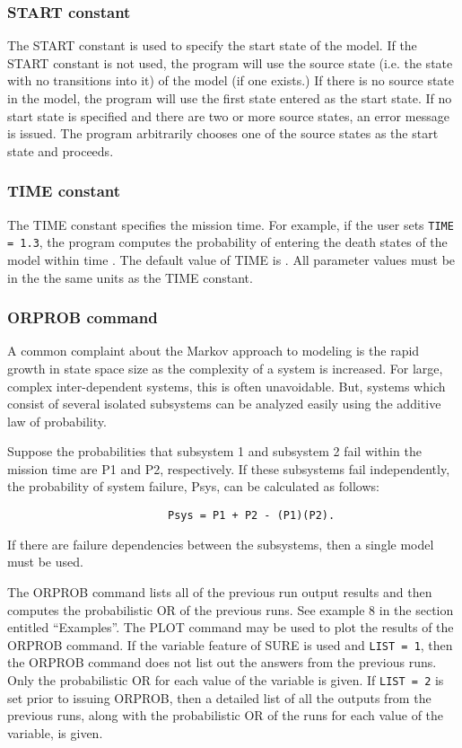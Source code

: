 \subsubsection{START constant} The {\isf START}
constant is used to specify the start state of the model.  If the {\isf START}
constant is not used, the program will use the source state (i.e. the state
with no transitions into it) of the model (if one exists.)  If there is no
source state in the model, the program will use the first state entered as the
start state.  If no start state is specified and there are two or more source
states, an error message is issued.  The program arbitrarily chooses one of
the source states as the start state and proceeds.

\subsubsection{TIME constant} The {\isf TIME}
constant specifies the mission time.  For example, if the user sets 
\verb|TIME = 1.3|, the program computes the probability of entering the
death states of the model within time {}.  The default value of {\isf
TIME} is {}.  All parameter values must be in the the same units as the
{\isf TIME} constant.

\subsubsection{ORPROB command} A common
complaint about the Markov approach to modeling is the rapid growth in state
space size as the complexity of a system is increased.  For large, complex
inter-dependent systems, this is often unavoidable.  But, systems which
consist of several isolated subsystems can be analyzed easily using the
additive law of probability.

Suppose the probabilities that subsystem 1 and subsystem 2 fail within the
mission time are {\isf P1} and {\isf P2,} respectively.  If these subsystems
fail independently, the probability of system failure, {\isf Psys,} can be
calculated as follows:
\begin{verbatim}
                         Psys = P1 + P2 - (P1)(P2).
\end{verbatim}
If there are failure dependencies between the subsystems, then a single model
must be used.

The {\isf ORPROB} command lists all of the previous run output results and
then computes the probabilistic OR of the previous runs.  See example 8 in the
section entitled ``Examples''.  The {\isf PLOT} command may be used to plot
the results of the {\isf ORPROB} command.  If the variable feature of SURE is
used and \verb|LIST = 1|, then the {\isf ORPROB} command does not list out the
answers from the previous runs.  Only the probabilistic OR for each value of
the variable is given.  If \verb|LIST = 2| is set prior to issuing {\isf ORPROB,}
then a detailed list of all the outputs from the previous runs, along with the
probabilistic OR of the runs for each value of the variable, is given.

